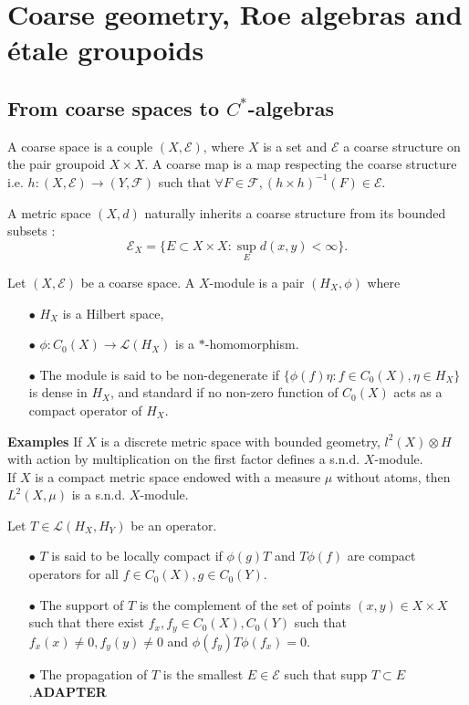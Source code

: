 \section{Coarse geometry, Roe algebras and étale groupoids}

\subsection{From coarse spaces to $C^*$-algebras}

\begin{definition}
A coarse space is a couple $(X,\mathcal E)$, where $X$ is a set and $\mathcal E$ a coarse structure on the pair groupoid $X\times X$. A coarse map is a map respecting the coarse structure i.e. $h : (X,\mathcal E)\rightarrow (Y,\mathcal F)$ such that $\forall F\in\mathcal F,(h\times h)^{-1}(F)\in \mathcal E$.
\end{definition}

A metric space $(X,d)$ naturally inherits a coarse structure from its bounded subsets :
\[\mathcal E_X = \{E\subset X\times X : \sup_{E} d(x,y)<\infty\}.\]

\begin{definition}
Let $(X,\mathcal E)$ be a coarse space. A $X$-module is a pair $(H_X,\phi )$ where 
\begin{itemize}
\item[$\bullet$] $H_X$ is a Hilbert space, 
\item[$\bullet$] $\phi : C_0(X)\rightarrow \mathcal L(H_X)$ is a $*$-homomorphism.
\item[$\bullet$] The module is said to be non-degenerate if $\{\phi(f)\eta : f\in C_0(X),\eta\in H_X\}$ is dense in $H_X$, and standard if no non-zero function of $C_0(X)$ acts as a compact operator of $H_X$.
\end{itemize}
\end{definition}

\textbf{Examples} If $X$ is a discrete metric space with bounded geometry, $l^2(X)\otimes H$ with action by multiplication on the first factor defines a s.n.d. $X$-module.\\
If $X$ is a compact metric space endowed with a measure $\mu$ without atoms, then $L^2(X,\mu)$ is a s.n.d. $X$-module.\\

\begin{definition}
Let $T\in \mathcal L(H_X, H_Y)$ be an operator.
\begin{itemize}
\item[$\bullet$] $T$ is said to be locally compact if $\phi(g)T$ and $T\phi(f)$ are compact operators for all $f\in C_0(X),g\in C_0(Y)$.
\item[$\bullet$] The support of $T$ is the complement of the set of points $(x,y)\in X\times X$ such that there exist $f_x,f_y\in C_0(X),C_0(Y)$ such that $f_x(x)\neq 0,f_{y}(y)\neq 0$ and $\phi(f_{y}) T \phi(f_x)=0$.
\item[$\bullet$] The propagation of $T$ is the smallest $E\in \mathcal E$ such that supp $T \subset E$.\textbf{ADAPTER}
\end{itemize}
\end{definition}

